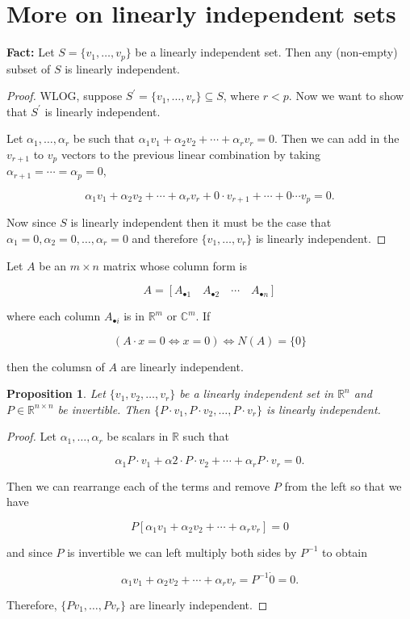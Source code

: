 \documentclass[12pt]{article}
\newtheorem*{proposition}{Proposition}
\theoremstyle{definition}
\begin{document}
\section{More on linearly independent sets}

\textbf{Fact:} Let $S = \{ v_1, \ldots, v_p \}$ be a linearly independent set. Then any
(non-empty) subset of $S$ is linearly independent.

\begin{proof}
WLOG, suppose $S^{\prime} = \{ v_1, \ldots, v_r \} \subseteq S$, where $r < p$. Now
we want to show that $S^{\prime}$ is linearly independent.

Let $\alpha_1, \ldots, \alpha_r$ be such that 
$\alpha_1 v_1 + \alpha_2 v_2 + \cdots + \alpha_r v_r = 0$. Then we can add in the 
$v_{r+1}$ to $v_p$ vectors to the previous linear combination by taking 
$\alpha_{r+1} = \cdots = \alpha_p = 0$,

\[ \alpha_1 v_1 + \alpha_2 v_2 + \cdots + \alpha_r v_r + 0 \cdot v_{r+1} + \cdots + 0 \cdots v_p = 0. \]

Now since $S$ is linearly independent then it must be the case that 
$\alpha_1 = 0, \alpha_2 = 0, \ldots, \alpha_r = 0$ and therefore $\{v_1, \ldots, v_r \}$ is
linearly independent.
\end{proof}

Let $A$ be an $m \times n$ matrix whose column form is

\[ A = [A_{\bullet 1} \quad A_{\bullet 2} \quad \cdots \quad A_{\bullet n} ] \]

where each column $A_{\bullet i}$ is in $\mathbb{R}^m$ or $\mathbb{C}^m$. If

\[ (A \cdot x = 0 \iff x = 0) \iff N(A) = \{ 0 \} \]

then the columsn of $A$ are linearly independent.

\begin{proposition}
Let $\{ v_1, v_2, \ldots, v_r \}$ be a linearly independent set in $\mathbb{R}^n$ and
$P \in \mathbb{R}^{n \times n}$ be invertible. Then
$\{ P \cdot v_1, P \cdot v_2, \ldots, P \cdot v_r \}$ is linearly independent.
\end{proposition} 

\begin{proof}
Let $\alpha_1, \ldots, \alpha_r$ be scalars in $\mathbb{R}$ such that

\[ \alpha_1 P \cdot v_1 + \alpha2 \cdot P \cdot v_2 + \cdots + \alpha_r P \cdot v_r = 0. \]

Then we can rearrange each of the terms and remove $P$ from the left so that we have

\[ P [\alpha_1 v_1 + \alpha_2 v_2 + \cdots + \alpha_r v_r ] = 0 \]

and since $P$ is invertible we can left multiply both sides by $P^{-1}$ to obtain

\[ \alpha_1 v_1 + \alpha_2 v_2 + \cdots + \alpha_r v_r  = P^{-1} \dot 0 = 0. \]

Therefore, $\{P v_1, \ldots, P v_r \}$ are linearly independent.

\end{proof}
\end{document}
